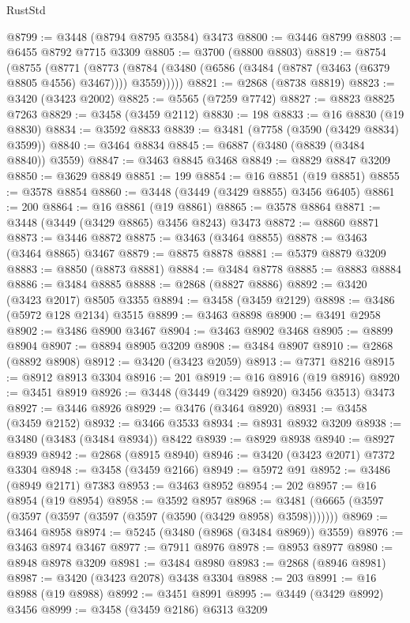 \begin{lexlean}{RustStd}
\begin{coremodule}
{\begin{coremodule}
{{{{{{{{{{{{{{{{{{{{{{{{{{{{{{{{{{{{{{{{{{{{{{{{{{{{{{{{{{{{{{{{{{{{{{{{{{{{{{{{{{{{{@8799 := @3448 (@8794 @8795 @3584) @3473
@8800 := @3446 @8799
@8803 := @6455 @8792 @7715 @3309
@8805 := @3700 (@8800 @8803)
@8819 := @8754
    (@8755
      (@8771
        (@8773 (@8784 (@3480 (@6586 (@3484 (@8787 (@3463 (@6379 @8805 @4556) @3467)))) @3559)))))
@8821 := @2868 (@8738 @8819)
@8823 := @3420 (@3423 @2002)
@8825 := @5565 (@7259 @7742)
@8827 := @8823 @8825 @7263
@8829 := @3458 (@3459 @2112)
@8830 := 198
@8833 := @16 @8830 (@19 @8830)
@8834 := @3592 @8833
@8839 := @3481 (@7758 (@3590 (@3429 @8834) @3599))
@8840 := @3464 @8834
@8845 := @6887 (@3480 (@8839 (@3484 @8840)) @3559)
@8847 := @3463 @8845 @3468
@8849 := @8829 @8847 @3209
@8850 := @3629 @8849
@8851 := 199
@8854 := @16 @8851 (@19 @8851)
@8855 := @3578 @8854
@8860 := @3448 (@3449 (@3429 @8855) @3456 @6405)
@8861 := 200
@8864 := @16 @8861 (@19 @8861)
@8865 := @3578 @8864
@8871 := @3448 (@3449 (@3429 @8865) @3456 @8243) @3473
@8872 := @8860 @8871
@8873 := @3446 @8872
@8875 := @3463 (@3464 @8855)
@8878 := @3463 (@3464 @8865) @3467
@8879 := @8875 @8878
@8881 := @5379 @8879 @3209
@8883 := @8850 (@8873 @8881)
@8884 := @3484 @8778
@8885 := @8883 @8884
@8886 := @3484 @8885
@8888 := @2868 (@8827 @8886)
@8892 := @3420 (@3423 @2017) @8505 @3355
@8894 := @3458 (@3459 @2129)
@8898 := @3486 (@5972 @128 @2134) @3515
@8899 := @3463 @8898
@8900 := @3491 @2958
@8902 := @3486 @8900 @3467
@8904 := @3463 @8902 @3468
@8905 := @8899 @8904
@8907 := @8894 @8905 @3209
@8908 := @3484 @8907
@8910 := @2868 (@8892 @8908)
@8912 := @3420 (@3423 @2059)
@8913 := @7371 @8216
@8915 := @8912 @8913 @3304
@8916 := 201
@8919 := @16 @8916 (@19 @8916)
@8920 := @3451 @8919
@8926 := @3448 (@3449 (@3429 @8920) @3456 @3513) @3473
@8927 := @3446 @8926
@8929 := @3476 (@3464 @8920)
@8931 := @3458 (@3459 @2152)
@8932 := @3466 @3533
@8934 := @8931 @8932 @3209
@8938 := @3480 (@3483 (@3484 @8934)) @8422
@8939 := @8929 @8938
@8940 := @8927 @8939
@8942 := @2868 (@8915 @8940)
@8946 := @3420 (@3423 @2071) @7372 @3304
@8948 := @3458 (@3459 @2166)
@8949 := @5972 @91
@8952 := @3486 (@8949 @2171) @7383
@8953 := @3463 @8952
@8954 := 202
@8957 := @16 @8954 (@19 @8954)
@8958 := @3592 @8957
@8968 := @3481 (@6665 (@3597 (@3597 (@3597 (@3597 (@3597 (@3590 (@3429 @8958) @3598)))))))
@8969 := @3464 @8958
@8974 := @5245 (@3480 (@8968 (@3484 @8969)) @3559)
@8976 := @3463 @8974 @3467
@8977 := @7911 @8976
@8978 := @8953 @8977
@8980 := @8948 @8978 @3209
@8981 := @3484 @8980
@8983 := @2868 (@8946 @8981)
@8987 := @3420 (@3423 @2078) @3438 @3304
@8988 := 203
@8991 := @16 @8988 (@19 @8988)
@8992 := @3451 @8991
@8995 := @3449 (@3429 @8992) @3456
@8999 := @3458 (@3459 @2186) @6313 @3209
}}}}}}}}}}}}}}}}}}}}}}}}}}}}}}}}}}}}}}}}}}}}}}}}}}}}}}}}}}}}}}}}}}}}}}}}}}}}}}}}}}}}}
\end{coremodule}}
\end{coremodule}
\end{lexlean}
